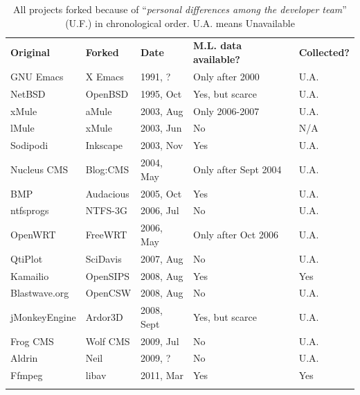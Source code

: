 \documentclass[11pt]{report}
\begin{document}
\begin{table}[!ht]
\centering
\caption{All projects forked because of ``\textit{personal differences among the developer team}'' (U.F.) \cite{Robles} in chronological order. U.A. means Unavailable}
\label{tabelProjectsForkedCat1PersonalDiffereces}       
\begin{tabular}{m{} m{} m{} m{} m{}}
\hline\noalign{\smallskip}
\textbf{Original} & \textbf{Forked} & \textbf{Date} & \textbf{M.L. data available?} & \textbf{Collected?}\\
\noalign{\smallskip}\hline\noalign{\smallskip}
GNU Emacs & X Emacs & 1991, ? & Only after 2000 & U.A. \\ \hline
NetBSD & OpenBSD & 1995, Oct & Yes, but scarce & U.A. \\ \hline
xMule & aMule & 2003, Aug & Only 2006-2007 & U.A. \\ \hline
lMule & xMule & 2003, Jun & No & N/A \\ \hline
Sodipodi & Inkscape & 2003, Nov & Yes & U.A.\\ \hline
Nucleus CMS & Blog:CMS & 2004, May & Only after Sept 2004 & U.A. \\ \hline
BMP & Audacious & 2005, Oct & Yes & U.A. \\ \hline
ntfsprogs & NTFS-3G & 2006, Jul & No & U.A. \\ \hline
OpenWRT & FreeWRT & 2006, May & Only after Oct 2006 & U.A. \\ \hline
QtiPlot & SciDavis & 2007, Aug & No & U.A. \\ \hline
Kamailio & OpenSIPS & 2008, Aug & Yes & Yes \\ \hline
Blastwave.org & OpenCSW & 2008, Aug & No & U.A. \\ \hline
jMonkeyEngine & Ardor3D & 2008, Sept & Yes, but scarce & U.A. \\ \hline
Frog CMS & Wolf CMS & 2009, Jul & No & U.A. \\ \hline
Aldrin & Neil & 2009, ? & No & U.A. \\ \hline
Ffmpeg & libav & 2011, Mar & Yes & Yes\\
\noalign{\smallskip}\hline
\end{tabular}
\end{table}
\end{document}
